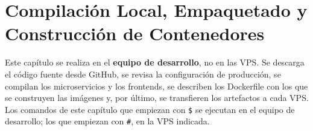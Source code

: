 \section{Compilación Local, Empaquetado y Construcción de Contenedores}\label{cap:04_compilacion_empaquetado}
Este capítulo se realiza en el \textbf{equipo de desarrollo}, no en las VPS. Se descarga el código fuente desde GitHub, se revisa la configuración de producción, se compilan los microservicios y los frontends, se describen los Dockerfile con los que se construyen las imágenes y, por último, se transfieren los artefactos a cada VPS. Los comandos de este capítulo que empiezan con \texttt{\$} se ejecutan en el equipo de desarrollo; los que empiezan con \texttt{\#}, en la VPS indicada.





